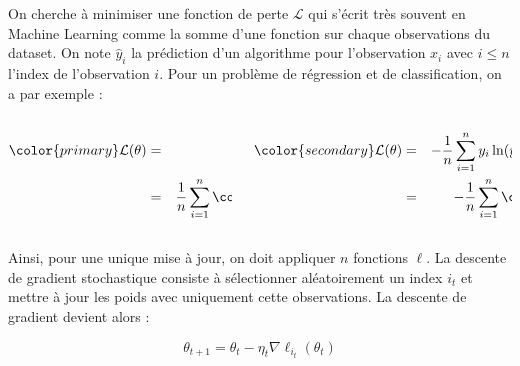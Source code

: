 \documentclass{beamer}
\begin{document}
\begin{frame}{}{}
	On cherche à minimiser une fonction de perte $\mathcal{L}$ qui s'écrit très souvent en Machine Learning comme la somme d'une fonction sur chaque observations du dataset. On note $\hat{y}_i$ la prédiction d'un algorithme pour l'observation $x_i$ avec $i\leqslant n$ l'index de l'observation $i$. Pour un problème de {\color{primary}régression} et de {\color{secondary}classification}, on a par exemple :
	
	\begin{columns}
		\begin{column}{0.5\textwidth}
			\begin{eqnarray*}
				{\color{primary}\mathcal{L}}(\theta) &=& \frac{1}{n}\sum_{i=1}^n (y_i - \hat{y}_i)^2\\
				&=& \frac{1}{n}\sum_{i=1}^n {\color{primary}\ell_i}(\theta)
			\end{eqnarray*}
		\end{column}
		\begin{column}{0.5\textwidth}
			\begin{eqnarray*}
				{\color{secondary}\mathcal{L}}(\theta) &=& -\frac{1}{n}\sum_{i=1}^n y_i\ln(\hat{y}_i)+(1-y_i)\ln(1-\hat{y}_i)\\
				&=& - \frac{1}{n}\sum_{i=1}^n {\color{secondary}\ell_i}(\theta)
			\end{eqnarray*}\newline
		\end{column}
	\end{columns}
	
	Ainsi, pour une unique mise à jour, on doit appliquer $n$ fonctions $\ell$. La descente de gradient stochastique consiste à sélectionner aléatoirement un index $i_t$ et mettre à jour les poids avec uniquement cette observations. La descente de gradient devient alors :
	
	\begin{equation*}
		\theta_{t+1} = \theta_t - \eta_t\nabla\ell_{i_t}(\theta_t)
	\end{equation*}
\end{frame}
\end{document}
